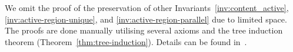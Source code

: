  


We omit the proof of the preservation of other Invariants~\ref{inv:content_active}, \ref{inv:active-region-unique}, and \ref{inv:active-region-parallel} due to limited space. 
The proofs are done manually utilising several axioms and the tree induction theorem (Theorem~\ref{thm:tree-induction}). 
Details can be found in~\cite{Hoang2023:SCXMLSemanticsModel}.

